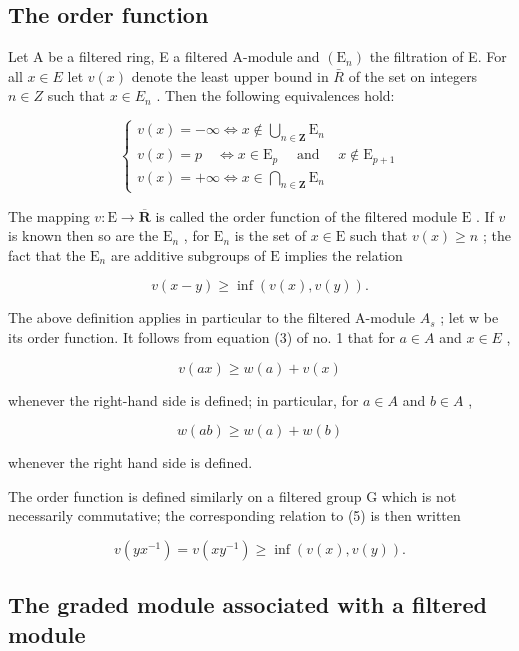 \subsection{The order function}

Let A be a filtered ring, E a filtered A-module and \((\mathrm{E}_{n})\) the filtration of E. For all \(x \in E\) let \(v(x)\) denote the least upper bound in \(\bar{R}\) of the set on integers \(n \in Z\) such that \(x \in E_{n}\) . Then the following equivalences hold:

\[
\left\{ \begin{array}{l} v (x) = - \infty \Leftrightarrow x \notin \bigcup_ {n \in \mathbf {Z}} \mathrm{E} _ {n} \\ v (x) = p \quad \Leftrightarrow x \in \mathrm{E} _ {p} \quad \text { and } \quad x \notin \mathrm{E} _ {p + 1} \\ v (x) = + \infty \Leftrightarrow x \in \bigcap_ {n \in \mathbf {Z}} \mathrm{E} _ {n} \end{array} \right.\tag{4}
\]

The mapping \(v: \mathrm{E} \to \overline{\mathbf{R}}\) is called the order function of the filtered module \(\mathrm{E}\) . If \(v\) is known then so are the \(\mathrm{E}_n\) , for \(\mathrm{E}_n\) is the set of \(x \in \mathrm{E}\) such that \(v(x) \geqslant n\) ; the fact that the \(\mathrm{E}_n\) are additive subgroups of \(\mathrm{E}\) implies the relation

\[
v (x - y) \geqslant \inf (v (x), v (y)).\tag{5}
\]

The above definition applies in particular to the filtered A-module \(A_{s}\) ; let w be its order function. It follows from equation (3) of no. 1 that for \(a \in A\) and \(x \in E\) ,

\[
v (a x) \geqslant w (a) + v (x)\tag{6}
\]

whenever the right-hand side is defined; in particular, for \(a \in A\) and \(b \in A\) ,

\[
w (a b) \geqslant w (a) + w (b)\tag{7}
\]

whenever the right hand side is defined.

The order function is defined similarly on a filtered group G which is not necessarily commutative; the corresponding relation to (5) is then written

\[
v (y x ^ {- 1}) = v (x y ^ {- 1}) \geqslant \inf (v (x), v (y)).\tag{5'}
\]

\subsection{The graded module associated with a filtered module}

